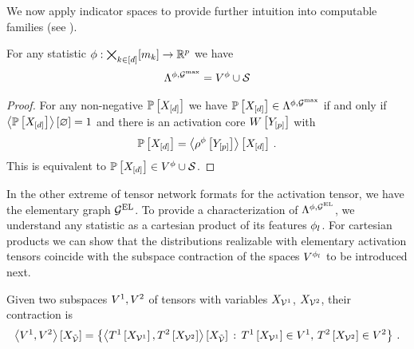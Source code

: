 
We now apply indicator spaces to provide further intuition into computable families (see ).


\begin{lemma}
    For any statistic $\phi : \bigtimes_{k\in[d]}[m_{k}]\rightarrow\mathbb{R}^{p}$ we have
    \begin{align*}
        \Lambda^{\phi,\mathcal{G}^{\mathrm{max}}} = V^{\phi} \cup \mathcal{S}
    \end{align*}
\end{lemma}
\begin{proof}
    For any non-negative $\mathbb{P}\left[X_{[d]}\right]$ we have $\mathbb{P}\left[X_{[d]}\right]\in\Lambda^{\phi,\mathcal{G}^{\mathrm{max}}}$ if and only if $\left\langle \mathbb{P}\left[X_{[d]}\right]\right\rangle \left[ \varnothing \right]=1$ and there is an activation core $W\left[Y_{[p]}\right]$ with
    \begin{align*}
        \mathbb{P}\left[X_{[d]}\right] = \left\langle \rho^{\phi}\left[Y_{[p]}\right]\right\rangle \left[ X_{[d]} \right] \, .
    \end{align*}
    This is equivalent to $\mathbb{P}\left[X_{[d]}\right]\in V^{\phi} \cup \mathcal{S}$.
\end{proof}

In the other extreme of tensor network formats for the activation tensor, we have the elementary graph $\mathcal{G}^{\mathrm{EL}}$.
To provide a characterization of $\Lambda^{\phi,\mathcal{G}^{\mathrm{EL}}}$, we understand any statistic as a cartesian product of its features $\phi_{l}$.
For cartesian products we can show that the distributions realizable with elementary activation tensors coincide with the subspace contraction of the spaces $V^{\phi_{l}}$ to be introduced next.

\begin{definition}
    Given two subspaces $V^{1},V^{2}$ of tensors with variables $X_{\mathcal{V}^{1}}$, $X_{\mathcal{V}^{2}}$, their contraction is
    \begin{align*}
        \left\langle V^{1},V^{2}\right\rangle \left[ X_{\tilde{\mathcal{V}}} \right]
        = \left\{ \left\langle T^{1}\left[X_{\mathcal{V}^{1}}\right],T^{2}\left[X_{\mathcal{V}^{2}}\right]\right\rangle \left[ X_{\tilde{\mathcal{V}}} \right]
        \, : \, T^{1}\left[X_{\mathcal{V}^{1}}\right]\in V^{1}, \, T^{2}\left[X_{\mathcal{V}^{2}}\right]\in V^{2} \right\} \, .
    \end{align*}
\end{definition}

